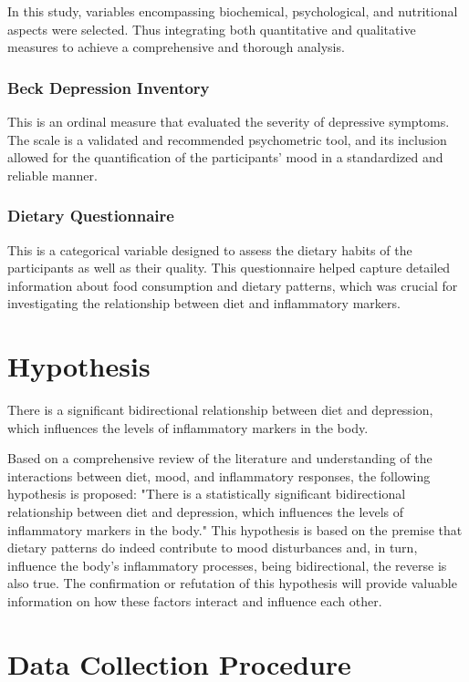 \documentclass[jou]{apa7}
\begin{document}
In this study, variables encompassing biochemical, psychological, and nutritional aspects were selected. Thus integrating both quantitative and qualitative measures to achieve a comprehensive and thorough analysis.\\

\subsubsection{Beck Depression Inventory}
This is an ordinal measure that evaluated the severity of depressive symptoms. The scale is a validated and recommended psychometric tool, and its inclusion allowed for the quantification of the participants' mood in a standardized and reliable manner.

\subsubsection{Dietary Questionnaire}
This is a categorical variable designed to assess the dietary habits of the participants as well as their quality. This questionnaire helped capture detailed information about food consumption and dietary patterns, which was crucial for investigating the relationship between diet and inflammatory markers.

\section{Hypothesis}\label{hipuxf3tesis}

There is a significant bidirectional relationship between diet and depression, which influences the levels of inflammatory markers in the body.

Based on a comprehensive review of the literature and understanding of the interactions between diet, mood, and inflammatory responses, the following hypothesis is proposed: "There is a statistically significant bidirectional relationship between diet and depression, which influences the levels of inflammatory markers in the body." This hypothesis is based on the premise that dietary patterns do indeed contribute to mood disturbances and, in turn, influence the body's inflammatory processes, being bidirectional, the reverse is also true. The confirmation or refutation of this hypothesis will provide valuable information on how these factors interact and influence each other.

\section{Data Collection Procedure}\label{procedimiento-para-recolecciuxf3n-de-datos}
\end{document}
